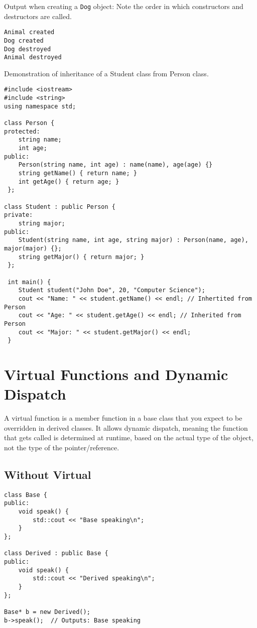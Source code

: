 \documentclass{article}
\begin{document}
\noindent Output when creating a \texttt{Dog} object:
Note the order in which constructors and destructors are called.
\begin{lstlisting}[style=cppstyle]
Animal created
Dog created
Dog destroyed
Animal destroyed
\end{lstlisting}

 
Demonstration of inheritance of a Student class from Person class.

\begin{lstlisting}[style=cppstyle]
#include <iostream>
#include <string>
using namespace std;

class Person {
protected:
	string name;
	int age;
public:
	Person(string name, int age) : name(name), age(age) {}
	string getName() { return name; }
	int getAge() { return age; }
 };

class Student : public Person {
private:
	string major;
public:
	Student(string name, int age, string major) : Person(name, age), major(major) {};
	string getMajor() { return major; }
 };

 int main() {
	Student student("John Doe", 20, "Computer Science");
	cout << "Name: " << student.getName() << endl; // Inhertited from Person
	cout << "Age: " << student.getAge() << endl; // Inherited from Person
	cout << "Major: " << student.getMajor() << endl;
 }

\end{lstlisting}

\section{Virtual Functions and Dynamic Dispatch}
A virtual function is a member function in a base class that you expect to be overridden in derived classes. It allows dynamic dispatch, meaning the function that gets called is determined at runtime, based on the actual type of the object, not the type of the pointer/reference.

\subsection{Without Virtual}

\begin{lstlisting}[style=cppstyle]
class Base {
public:
    void speak() {
        std::cout << "Base speaking\n";
    }
};

class Derived : public Base {
public:
    void speak() {
        std::cout << "Derived speaking\n";
    }
};

Base* b = new Derived();
b->speak();  // Outputs: Base speaking
\end{lstlisting}
\end{document}
